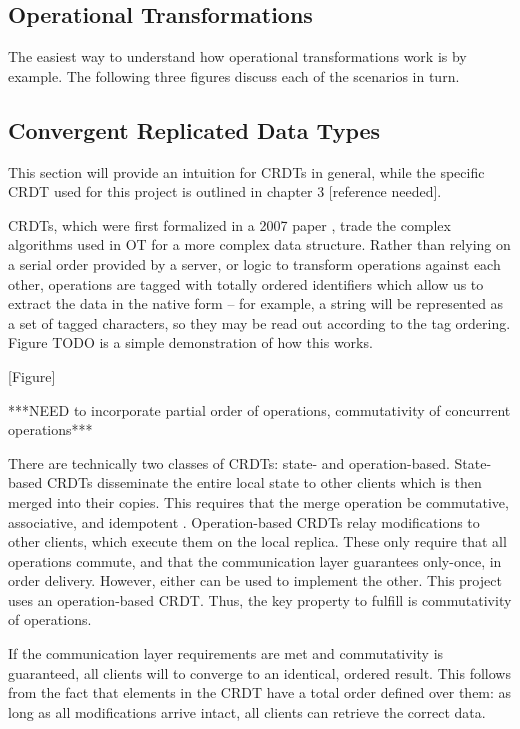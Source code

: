 \documentclass[12pt,a4paper,twoside,openright]{report}
\begin{document}
	\subsection{Operational Transformations}
	
	The easiest way to understand how operational transformations work is by example. The following three figures discuss each of the scenarios in turn.
	
	
	
	
		
	\subsection{Convergent Replicated Data Types}
	
	This section will provide an intuition for CRDTs in general, while the specific CRDT used for this project is outlined in chapter 3 [reference needed].

	CRDTs, which were first formalized in a 2007 paper \cite{shapiro2007}, trade the complex algorithms used in OT for a more complex data structure. Rather than relying on a serial order provided by a server, or logic to transform operations against each other, operations are tagged with totally ordered identifiers which allow us to extract the data in the native form -- for example, a string will be represented as a set of tagged characters, so they may be read out according to the tag ordering. Figure TODO is a simple demonstration of how this works. 
	
	[Figure]
	
	***NEED to incorporate partial order of operations, commutativity of concurrent operations***
	
	There are technically two classes of CRDTs: state- and operation-based. State-based CRDTs disseminate the entire local state to other clients which is then merged into their copies. This requires that the merge operation be commutative, associative, and idempotent \cite{shapiro2011}. Operation-based CRDTs relay modifications to other clients, which execute them on the local replica. These only require that all operations commute, and that the communication layer guarantees only-once, in order delivery\cite{takada2013}. However, either can be used to implement the other. This project uses an operation-based CRDT. Thus, the key property to fulfill is commutativity of operations.
	
	If the communication layer requirements are met and commutativity is guaranteed, all clients will to converge to an identical, ordered result. This follows from the fact that elements in the CRDT have a total order defined over them: as long as all modifications arrive intact, all clients can retrieve the correct data.
\end{document}
